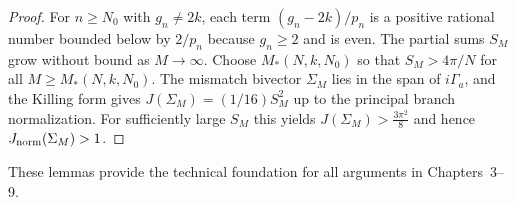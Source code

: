 \documentclass[dvipdfmx,a4paper]{article}
\theoremstyle{definition}
\theoremstyle{remark}
\newcommand{\Jnorm}{J_{\rm norm}}
\newcommand{\Jbound}{\frac{3\pi^2}{8}}
\begin{document}
\begin{proof}
For \( n \geq N_0 \) with \( g_n \neq 2k \), each term \( (g_n - 2k)/p_n \) is a positive rational number bounded below by \( 2/p_n \) because \( g_n \geq 2 \) and is even. The partial sums \( S_M \) grow without bound as \( M \to \infty \). Choose \( M_*(N,k,N_0) \) so that \( S_M > 4\pi/N \) for all \( M \geq M_*(N,k,N_0) \). The mismatch bivector \( \Sigma_M \) lies in the span of \( i\Gamma_a \), and the Killing form gives \( J(\Sigma_M) = (1/16) S_M^2 \) up to the principal branch normalization. For sufficiently large \( S_M \) this yields \( J(\Sigma_M) > \Jbound \) and hence \( \Jnorm(\Sigma_M) > 1 \).
\end{proof}

These lemmas provide the technical foundation for all arguments in Chapters~3--9.
\end{document}

